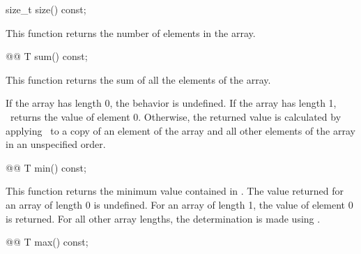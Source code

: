 \documentclass[american,twoside]{book}
\begin{document}
\begin{paras}
\begin{itemdescr}
\pnum
{}

\pnum
{}
\end{itemdescr}

%
\begin{itemdecl}
size_t size() const;
\end{itemdecl}

\begin{itemdescr}
\pnum
This function returns the number of elements in the array.
\end{itemdescr}

%
\begin{itemdecl}
@@ T sum() const;
\end{itemdecl}

\begin{itemdescr}
This function returns the sum of all the elements of the array.

\pnum
If the array has length 0, the behavior is undefined.%
If the array has length 1,
\
returns the value of element 0.
Otherwise, the returned value is calculated by applying
\tcode{operator+=}\
to a copy of an element of the array and
all other elements of the array in an unspecified order.%
\end{itemdescr}

%
\begin{itemdecl}
@@ T min() const;
\end{itemdecl}

\begin{itemdescr}
\pnum
This function returns the minimum value contained in
\tcode{*this}.
The value returned for an array of length 0 is undefined.
For an array
of length 1, the value of element 0 is returned.
For all other array
lengths, the determination is made using
\tcode{operator<}.
\end{itemdescr}

%
\begin{itemdecl}
@@ T max() const;
\end{itemdecl}


\end{paras}
\end{document}
